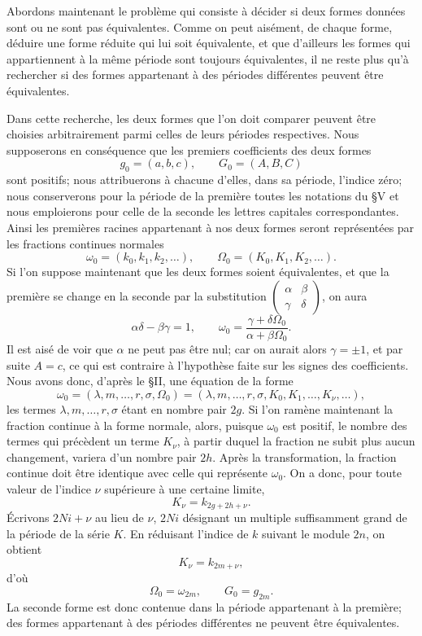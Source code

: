 \documentclass[11pt]{article}
\begin{document}
Abordons maintenant le problème qui consiste à décider si deux formes données sont ou ne sont pas équivalentes. Comme on peut aisément, de chaque forme, déduire une forme réduite qui lui soit équivalente, et que d'ailleurs les formes qui appartiennent à la même période sont toujours équivalentes, il ne reste plus qu'à rechercher si des formes appartenant à des périodes différentes peuvent être équivalentes.

Dans cette recherche, les deux formes que l'on doit comparer peuvent être choisies arbitrairement parmi celles de leurs périodes respectives. Nous supposerons en conséquence que les premiers coefficients des deux formes
\[
  g_0=(a,b,c),\qquad G_0=(A,B,C)
\]
sont positifs; nous attribuerons à chacune d'elles, dans sa période, l'indice zéro; nous conserverons pour la période de la première toutes les notations du \S V et nous emploierons pour celle de la seconde les lettres capitales correspondantes. Ainsi les premières racines appartenant à nos deux formes seront représentées par les fractions continues normales
\[
  \omega_0=(k_0,k_1,k_2,\ldots),\qquad
  \Omega_0=(K_0,K_1,K_2,\ldots).
\]
Si l'on suppose maintenant que les deux formes soient équivalentes, et que la première se change en la seconde par la substitution $\begin{pmatrix}\alpha&\beta\\ \gamma&\delta\end{pmatrix}$, on aura
\[
  \alpha\delta-\beta\gamma=1,
  \qquad
  \omega_0=\frac{\gamma+\delta\Omega_0}{\alpha+\beta\Omega_0}.
\]
Il est aisé de voir que $\alpha$ ne peut pas être nul; car on aurait alors $\gamma=\pm1$, et par suite $A=c$, ce qui est contraire à l'hypothèse faite sur les signes des coefficients. Nous avons donc, d'après le \S II, une équation de la forme
\[
  \omega_0=(\lambda,m,\ldots,r,\sigma,\Omega_0)
       =(\lambda,m,\ldots,r,\sigma,K_0,K_1,\ldots,K_\nu,\ldots),
\]
les termes $\lambda,m,\ldots,r,\sigma$ étant en nombre pair $2g$. Si l'on ramène maintenant la fraction continue à la forme normale, alors, puisque $\omega_0$ est positif, le nombre des termes qui précèdent un terme $K_\nu$, à partir duquel la fraction ne subit plus aucun changement, variera d'un nombre pair $2h$. Après la transformation, la fraction continue doit être identique avec celle qui représente $\omega_0$. On a donc, pour toute valeur de l'indice $\nu$ supérieure à une certaine limite,
\[
  K_\nu=k_{2g+2h+\nu}.
\]
Écrivons $2Ni+\nu$ au lieu de $\nu$, $2Ni$ désignant un multiple suffisamment grand de la période de la série $K$. En réduisant l'indice de $k$ suivant le module $2n$, on obtient
\[
  K_\nu=k_{2m+\nu},
\]
d'où
\[
  \Omega_0=\omega_{2m},\qquad G_0=g_{2m}.
\]
La seconde forme est donc contenue dans la période appartenant à la première; des formes appartenant à des périodes différentes ne peuvent être équivalentes.
\end{document}
